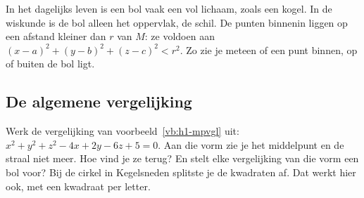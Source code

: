 In het dagelijks leven is een bol vaak een vol lichaam, zoals een kogel. In de wiskunde is de bol alleen het oppervlak, de schil. De punten binnenin liggen op een afstand kleiner dan $r$ van $M$: ze voldoen aan $(x - a)^2 + (y - b)^2 + (z - c)^2 < r^2$. Zo zie je meteen of een punt binnen, op of buiten de bol ligt.



\begin{oefeningen}
\end{oefeningen}

\subsection{De algemene vergelijking}

Werk de vergelijking van voorbeeld~\ref{vb:h1-mpvgl} uit: $x^2 + y^2 + z^2 - 4x + 2y - 6z + 5 = 0$. Aan die vorm zie je het middelpunt en de straal niet meer. Hoe vind je ze terug? En stelt elke vergelijking van die vorm een bol voor? Bij de cirkel in Kegelsneden splitste je de kwadraten af. Dat werkt hier ook, met een kwadraat per letter.

